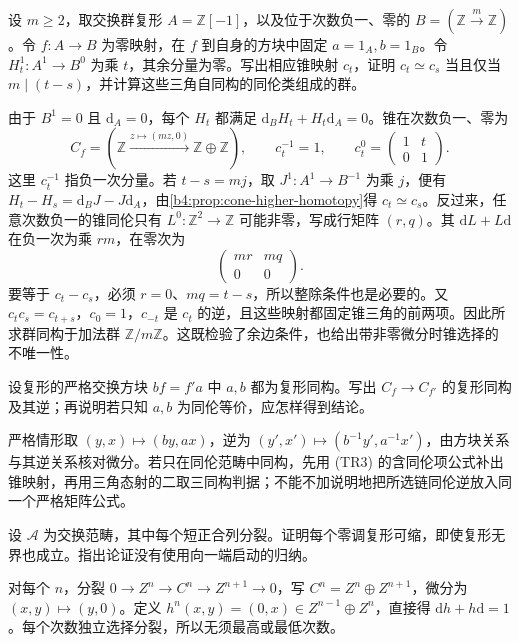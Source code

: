 \begin{exercise}\label{b4:ex:16-different-homotopies}
	设 \(m\ge2\)，取交换群复形 \(A=\mathbb Z[-1]\)，以及位于次数负一、零的 \(B=(\mathbb Z\xrightarrow{m}\mathbb Z)\)。令 \(f:A\to B\) 为零映射，在 \(f\) 到自身的方块中固定 \(a=1_A,b=1_B\)。令 \(H_t^1:A^1\to B^0\) 为乘 \(t\)，其余分量为零。写出相应锥映射 \(c_t\)，证明 \(c_t\simeq c_s\) 当且仅当 \(m\mid(t-s)\)，并计算这些三角自同构的同伦类组成的群。
\end{exercise}
\begin{solution}
	由于 \(B^1=0\) 且 \(\mathrm{d}_A=0\)，每个 \(H_t\) 都满足 \(\mathrm{d}_BH_t+H_t\mathrm{d}_A=0\)。锥在次数负一、零为
	\[
		C_f=(\mathbb Z\xrightarrow{z\mapsto(mz,0)}\mathbb Z\oplus\mathbb Z), \qquad c_t^{-1}=1,\qquad
		c_t^0=\begin{pmatrix}1&t\\0&1\end{pmatrix}.
	\]
	这里 \(c_t^{-1}\) 指负一次分量。若 \(t-s=mj\)，取 \(J^1:A^1\to B^{-1}\) 为乘 \(j\)，便有 \(H_t-H_s=\mathrm{d}_BJ-J\mathrm{d}_A\)，由\cref{b4:prop:cone-higher-homotopy}得 \(c_t\simeq c_s\)。反过来，任意次数负一的锥同伦只有 \(L^0:\mathbb Z^2\to\mathbb Z\) 可能非零，写成行矩阵 \((r,q)\)。其 \(\mathrm{d}L+L\mathrm{d}\) 在负一次为乘 \(rm\)，在零次为
	\[
		\begin{pmatrix}mr&mq\\0&0\end{pmatrix}.
	\]
	要等于 \(c_t-c_s\)，必须 \(r=0\)、\(mq=t-s\)，所以整除条件也是必要的。又 \(c_tc_s=c_{t+s}\)，\(c_0=1\)，\(c_{-t}\) 是 \(c_t\) 的逆，且这些映射都固定锥三角的前两项。因此所求群同构于加法群 \(\mathbb Z/m\mathbb Z\)。这既检验了余边条件，也给出带非零微分时锥选择的不唯一性。
\end{solution}

\begin{exercise}\label{b4:ex:16-cone-square-iso}
	设复形的严格交换方块 \(bf=f'a\) 中 \(a,b\) 都为复形同构。写出 \(C_f\to C_{f'}\) 的复形同构及其逆；再说明若只知 \(a,b\) 为同伦等价，应怎样得到结论。
\end{exercise}
\begin{solution}
	严格情形取 \((y,x)\mapsto(by,ax)\)，逆为 \((y',x')\mapsto(b^{-1}y',a^{-1}x')\)，由方块关系与其逆关系核对微分。若只在同伦范畴中同构，先用 (TR3) 的含同伦项公式补出锥映射，再用三角态射的二取三同构判据；不能不加说明地把所选链同伦逆放入同一个严格矩阵公式。
\end{solution}

\begin{exercise}\label{b4:ex:16-nonsplit-semisimple}
	设 \(\mathcal A\) 为交换范畴，其中每个短正合列分裂。证明每个零调复形可缩，即使复形无界也成立。指出论证没有使用向一端启动的归纳。
\end{exercise}
\begin{solution}
	对每个 \(n\)，分裂 \(0\to Z^n\to C^n\to Z^{n+1}\to0\)，写 \(C^n=Z^n\oplus Z^{n+1}\)，微分为 \((x,y)\mapsto(y,0)\)。定义 \(h^n(x,y)=(0,x)\in Z^{n-1}\oplus Z^n\)，直接得 \(\mathrm{d}h+h\mathrm{d}=1\)。每个次数独立选择分裂，所以无须最高或最低次数。
\end{solution}

